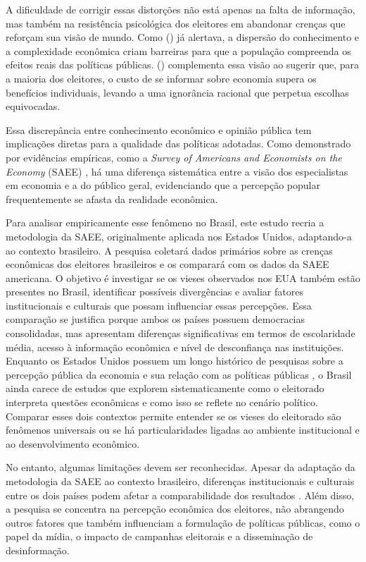 A dificuldade de corrigir essas distorções não está apenas na falta de informação, mas também na resistência psicológica dos eleitores em abandonar crenças que reforçam sua visão de mundo. Como  (\citeyear{hayek_knowledge_use}) já alertava, a dispersão do conhecimento e a complexidade econômica criam barreiras para que a população compreenda os efeitos reais das políticas públicas.  (\citeyear{downs1957economic}) complementa essa visão ao sugerir que, para a maioria dos eleitores, o custo de se informar sobre economia supera os benefícios individuais, levando a uma ignorância racional que perpetua escolhas equivocadas.

Essa discrepância entre conhecimento econômico e opinião pública tem implicações diretas para a qualidade das políticas adotadas. Como demonstrado por evidências empíricas, como a \textit{Survey of Americans and Economists on the Economy} (SAEE) \cite{saee1996}, há uma diferença sistemática entre a visão dos especialistas em economia e a do público geral, evidenciando que a percepção popular frequentemente se afasta da realidade econômica.

Para analisar empiricamente esse fenômeno no Brasil, este estudo recria a metodologia da SAEE, originalmente aplicada nos Estados Unidos, adaptando-a ao contexto brasileiro. A pesquisa coletará dados primários sobre as crenças econômicas dos eleitores brasileiros e os comparará com os dados da SAEE americana. O objetivo é investigar se os vieses observados nos EUA também estão presentes no Brasil, identificar possíveis divergências e avaliar fatores institucionais e culturais que possam influenciar essas percepções. Essa comparação se justifica porque ambos os países possuem democracias consolidadas, mas apresentam diferenças significativas em termos de escolaridade média, acesso à informação econômica e nível de desconfiança nas instituições. Enquanto os Estados Unidos possuem um longo histórico de pesquisas sobre a percepção pública da economia e sua relação com as políticas públicas \cite{blendon1997,Systematically_Biased_Beliefs_about_Economics, page1992}, o Brasil ainda carece de estudos que explorem sistematicamente como o eleitorado interpreta questões econômicas e como isso se reflete no cenário político. Comparar esses dois contextos permite entender se os vieses do eleitorado são fenômenos universais ou se há particularidades ligadas ao ambiente institucional e ao desenvolvimento econômico.

No entanto, algumas limitações devem ser reconhecidas. Apesar da adaptação da metodologia da SAEE ao contexto brasileiro, diferenças institucionais e culturais entre os dois países podem afetar a comparabilidade dos resultados \cite{laporta1999quality,north1990institutions,acemoglu2012nations}. Além disso, a pesquisa se concentra na percepção econômica dos eleitores, não abrangendo outros fatores que também influenciam a formulação de políticas públicas, como o papel da mídia, o impacto de campanhas eleitorais e a disseminação de desinformação.

